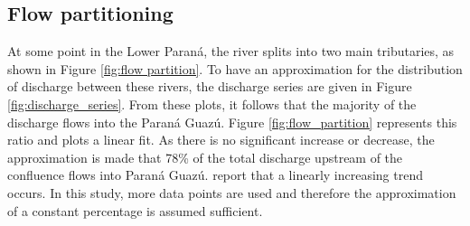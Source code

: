 \subsection{Flow partitioning}

At some point in the Lower Paraná, the river splits into two main tributaries, as shown in Figure \ref{fig:flow partition}. To have an approximation for the distribution of discharge between these rivers, the discharge series are given in Figure \ref{fig:discharge_series}. From these plots, it follows that the majority of the discharge flows into the Paraná Guazú. Figure \ref{fig:flow_partition} represents this ratio and plots a linear fit. As there is no significant increase or decrease, the approximation is made that 78\% of the total discharge upstream of the confluence flows into Paraná Guazú. \citeauthor{reMetodologiaParaGeneracion2009} report that a linearly increasing trend occurs. In this study, more data points are used and therefore the approximation of a constant percentage is assumed sufficient. 

